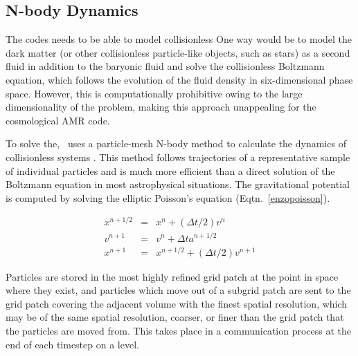 \subsection{N-body Dynamics}
\label{sec.ov.nbody}

The codes needs to be able to model collisionless 
One way would be to model the dark matter (or other collisionless particle-like objects, such as stars) as a second fluid in addition to the baryonic fluid and solve the collisionless Boltzmann equation, which follows the evolution of the fluid density in six-dimensional phase space.  However, this is computationally prohibitive owing to the large dimensionality of the problem, making this approach  unappealing for the cosmological AMR code.

To solve the, \enzo\ uses a particle-mesh N-body method to calculate 
the dynamics of collisionless systems \citep{Hockney88}.  This method 
follows trajectories 
of a representative sample of individual particles and is much more 
efficient than a direct solution of the Boltzmann equation in most 
astrophysical situations. 
The gravitational potential is computed by solving the elliptic 
Poisson's equation (Eqtn.~\ref{enzopoisson}).

\begin{eqnarray}
x^{n+1/2} & = & x^n + (\Delta t/2) v^{n} \nonumber \\
v^{n+1} & = & v^n + \Delta t a^{n+1/2} \\
x^{n+1} & = & x^{n+1/2} + (\Delta t/2) v^{n+1} \nonumber
\end{eqnarray}



Particles are stored in the most highly refined grid patch at the point in space where they exist, and particles which move out of a subgrid patch are sent to the grid patch covering the adjacent volume with the finest spatial resolution, which may be of the same spatial resolution, coarser, or finer than the grid patch that the particles are moved from.  This takes place in a communication process at the end of each timestep on a level.

